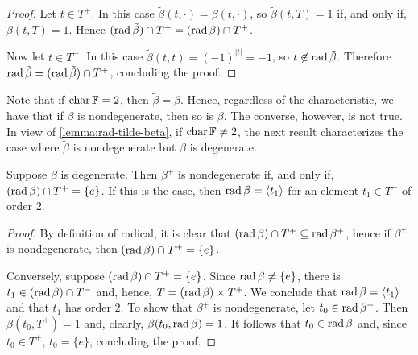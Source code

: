 \begin{proof}
	Let $t\in T^+$.
	In this case $\tilde\beta (t, \cdot) = \beta (t, \cdot)$, so
	$\tilde\beta (t, T) = 1$ if, and only if, $\beta (t, T) = 1$.
	Hence $(\operatorname{rad} \tilde\beta)\cap T^+ = (\operatorname{rad} \beta)\cap T^+$.

	Now let $t \in T^-$.
	In this case $\tilde \beta (t,t) = (-1)^{|t|} = -1$, so $t \not\in \operatorname{rad} \tilde\beta$.
	Therefore $\operatorname{rad} \tilde\beta = (\operatorname{rad} \tilde\beta)\cap T^+$, concluding the proof.
\end{proof}

Note that if $\operatorname{char} \mathbb{F} = 2$, then $\tilde\beta = \beta$. 
Hence, regardless of the characteristic, we have that if $\beta$ is nondegenerate, then so is $\tilde\beta$. 
The converse, however, is not true. 
In view of \cref{lemma:rad-tilde-beta}, if $\operatorname{char} \mathbb{F} \neq 2$, the next result characterizes the case where $\tilde\beta$ is nondegenerate but $\beta$ is degenerate. 

\begin{lemma}\label{lemma:beta-deg-beta-tilde-nondeg}
    Suppose $\beta$ is degenerate. 
    Then $\beta^+$ is nondegenerate if, and only if, $(\operatorname{rad} \beta) \cap T^+ = \{e\}$. 
    If this is the case, then $\operatorname{rad} \beta = \langle t_1 \rangle$ for an element $t_1 \in T^-$ of order $2$. 
\end{lemma}

\begin{proof}
    By definition of radical, it is clear that $(\operatorname{rad} \beta) \cap T^+ \subseteq \operatorname{rad} \beta^+$, hence if $\beta^+$ is nondegenerate, then $(\operatorname{rad} \beta) \cap T^+ = \{e\}$. 
    
    Conversely, suppose $(\operatorname{rad} \beta) \cap T^+ = \{e\}$. 
    Since $\operatorname{rad}\beta \neq \{e\}$, there is $t_1 \in (\operatorname{rad} \beta) \cap T^-$ and, hence, $T = (\operatorname{rad}\beta) \times T^+$. 
    We conclude that $\operatorname{rad} \beta = \langle t_1 \rangle$ and that $t_1$ has order $2$. 
    To show that $\beta^+$ is nondegenerate, let $t_0 \in \operatorname{rad} \beta^+$. 
    Then $\beta(t_0, T^+) = 1$ and, clearly, $\beta(t_0, \operatorname{rad} \beta) = 1$. 
    It follows that $t_0 \in \operatorname{rad} \beta$ and, since $t_0 \in T^+$, $t_0 = \{e\}$, concluding the proof. 
\end{proof}


